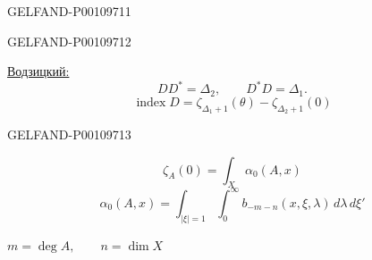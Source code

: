 \begin{GelfandAdjacentEvidence}{GELFAND-P001097}{11}

\end{GelfandAdjacentEvidence}
\begin{GelfandAdjacentEvidence}{GELFAND-P001097}{12}


\underline{Водзицкий:}
\[
DD^*=\Delta_2,\qquad D^*D=\Delta_1.
\]
\[
\operatorname{index}D=\zeta_{\Delta_1+1}(\theta)-\zeta_{\Delta_2+1}(0)
\]
\end{GelfandAdjacentEvidence}
\begin{GelfandAdjacentEvidence}{GELFAND-P001097}{13}


\[
\zeta_A(0)=\int_X\alpha_0(A,x)
\]
\[
\alpha_0(A,x)=\int_{\lvert\xi\rvert=1}\int_0^\infty
b_{-m-n}(x,\xi,\lambda)\,d\lambda\,d\xi'
\]
\end{GelfandAdjacentEvidence}


$m=\operatorname{deg}A,\qquad n=\dim X$


